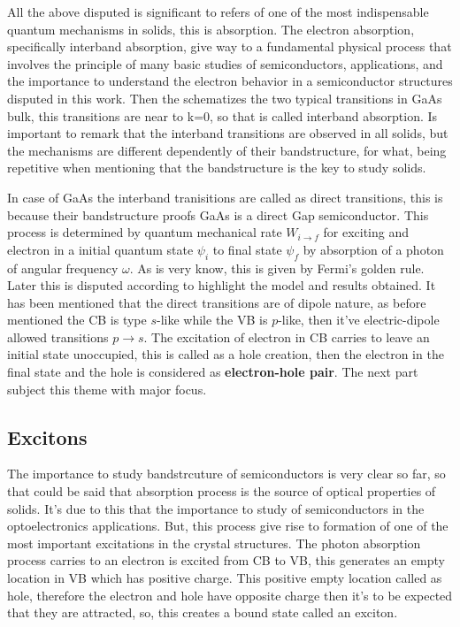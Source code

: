 All the above disputed is significant to refers of one of the most indispensable quantum mechanisms in solids, this is absorption. The electron absorption, specifically interband absorption, give way to a fundamental physical process that involves the principle of many basic studies of semiconductors, applications, and the importance to understand the electron behavior in a semiconductor structures disputed in this work. Then the  schematizes the two typical transitions in GaAs bulk, this transitions are near to k=0, so that is called interband absorption. Is important to remark that the interband transitions are observed in all solids, but the mechanisms are different dependently of their bandstructure, for what,  being repetitive when mentioning that the bandstructure is the key to study solids. 

In case of GaAs the interband tranisitions are called as direct transitions, this is because their bandstructure proofs GaAs is a direct Gap semiconductor.  This process is determined by quantum mechanical rate $W_{i\to f}$ for exciting and electron in a initial quantum state $\psi_{i}$ to final state $\psi_{f}$ by absorption of a photon of angular frequency $\omega$\cite{fox2002optical}. As is very know, this is given by Fermi's golden rule. Later this is disputed according to highlight the model and results obtained. It has been mentioned that the direct transitions are of dipole nature, as before mentioned the CB is type $s$-like while the VB is $p$-like, then it've electric-dipole allowed transitions $p\to s$. The excitation of electron in CB carries to leave an initial state unoccupied, this is called as a hole creation, then the electron in the final state and the hole is considered as \textbf{electron-hole pair}. The next part subject this theme with major focus.


\subsection{Excitons}
\label{subsec:chapter-1-excitons}
\vspace{-10mm}
The importance to study bandstrcuture of semiconductors is very clear so far, so that could be said that absorption process is the source of optical properties of solids. It's due to this that the importance to study of semiconductors in the optoelectronics applications. But, this process give rise to formation of one of the most important excitations in the crystal structures. The photon absorption process carries to an electron is excited from CB to VB, this  generates an empty location in VB which has positive charge. This positive empty location called as hole, therefore the electron and hole have opposite charge then it's  to be expected that they are attracted, so, this creates a bound state called an exciton\cite{leonard2017exciton}. 

